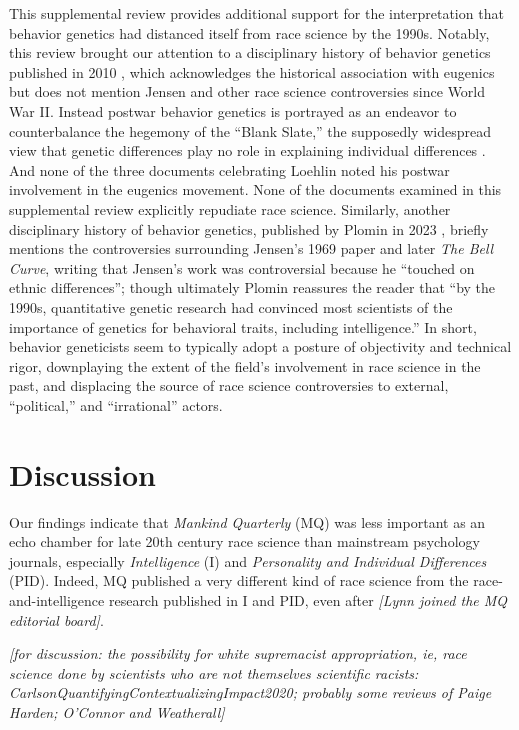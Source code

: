 \documentclass[12pt]{article}
\begin{document}
This supplemental review provides additional support for the interpretation that behavior genetics had distanced itself from race science by the 1990s. Notably, this review brought our attention to a disciplinary history of behavior genetics published in 2010 \cite{McGueEndBehavioralGenetics2010}, which acknowledges the historical association with eugenics but does not mention Jensen and other race science controversies since World War II. Instead postwar behavior genetics is portrayed as an endeavor to counterbalance the hegemony of the ``Blank Slate,'' the supposedly widespread view that genetic differences play no role in explaining individual differences \cite{BatesonCorpseWearisomeDebate2002}. And none of the three documents celebrating Loehlin noted his postwar involvement in the eugenics movement. None of the documents examined in this supplemental review explicitly repudiate race science. Similarly, another disciplinary history of behavior genetics, published by Plomin in 2023 \cite{PlominCelebratingCenturyResearch2023}, briefly mentions the controversies surrounding Jensen's 1969 paper and later \emph{The Bell Curve}, writing that Jensen's work was controversial because he ``touched on ethnic differences''; though ultimately Plomin reassures the reader that ``by the 1990s, quantitative genetic research had convinced most scientists of the importance of genetics for behavioral traits, including intelligence.'' In short, behavior geneticists seem to typically adopt a posture of objectivity and technical rigor, downplaying the extent of the field's involvement in race science in the past, and displacing the source of race science controversies to external, ``political,'' and ``irrational'' actors.

\hypertarget{discussion}{%
\section*{Discussion}\label{discussion}}

Our findings indicate that \emph{Mankind Quarterly} (MQ) was less important as an echo chamber for late 20th century race science than mainstream psychology journals, especially \emph{Intelligence} (I) and \emph{Personality and Individual Differences} (PID). Indeed, MQ published a very different kind of race science from the race-and-intelligence research published in I and PID, even after \emph{{[}Lynn joined the MQ editorial board{]}}.

\emph{{[}for discussion: the possibility for white supremacist appropriation, ie, race science done by scientists who are not themselves scientific racists: CarlsonQuantifyingContextualizingImpact2020; probably some reviews of Paige Harden; O'Connor and Weatherall{]}}
\end{document}
